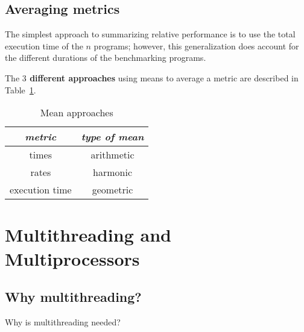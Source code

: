 \documentclass[english]{article}
\begin{document}
\subsection{Averaging metrics}

The simplest approach to summarizing relative performance is to use the total execution time of the \(n\) programs;
however, this generalization does account for the different durations of the benchmarking programs.

The \textbf{\(3\) different approaches} using means to average a metric are described in Table~\ref{tab:mean-approaches}.

\begin{table}[htbp]
  \centering
  \begin{tabular}{c|c}
    \textit{metric} & \textit{type of mean} \\ \hline
    times           & arithmetic            \\
    rates           & harmonic              \\
    execution time  & geometric             \\
  \end{tabular}
  \caption{Mean approaches}
  \label{tab:mean-approaches}
\end{table}

\clearpage

\section{Multithreading and Multiprocessors}

\subsection{Why multithreading?}

Why is multithreading needed?
\end{document}

